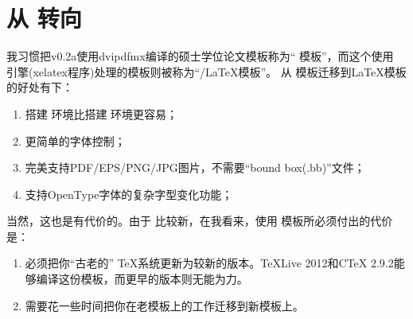 \chapter{从 {\CJKLaTeX} 转向 \texorpdfstring{\XeTeX}{XeTeX}}
\label{chap:whydvipdfm}

\hspace{2em}我习惯把v0.2a使用dvipdfmx编译的硕士学位论文模板称为“ \CJKLaTeX 模板”，而这个使用 \XeTeX 引擎(xelatex程序)处理的模板则被称为“{\XeTeX/\LaTeX}模板”。
从 \CJKLaTeX 模板迁移到{\XeTeX\LaTeX}模板的好处有下：
\begin{enumerate}
\item[\large\smiley] 搭建 \XeTeX 环境比搭建 \CJKLaTeX 环境更容易；
\item[\large\smiley] 更简单的字体控制；
\item[\large\smiley] 完美支持PDF/EPS/PNG/JPG图片，不需要“bound box(.bb)”文件；
\item[\large\smiley] 支持OpenType字体的复杂字型变化功能；
\end{enumerate}

\hspace{2em}当然，这也是有代价的。由于 \XeTeX 比较新，在我看来，使用 \XeTeX 模板所必须付出的代价是：

\begin{enumerate}
\item[\large\frownie] 必须把你“古老的” \TeX 系统更新为较新的版本。TeXLive 2012和CTeX 2.9.2能够编译这份模板，而更早的版本则无能为力。
\item[\large\frownie] 需要花一些时间把你在老模板上的工作迁移到新模板上。
\end{enumerate}


